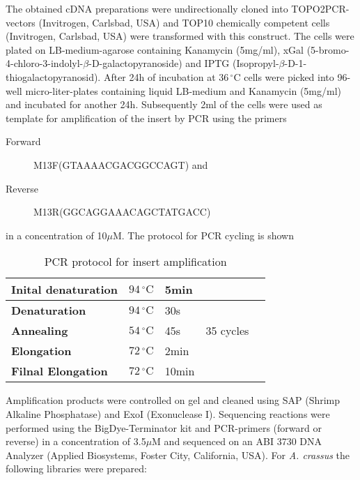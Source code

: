 The obtained cDNA preparations were undirectionally cloned into
TOPO2PCR-vectors (Invitrogen, Carlsbad, USA) and TOP10 chemically
competent cells (Invitrogen, Carlsbad, USA) were transformed with this
construct. The cells were plated on LB-medium-agarose containing
Kanamycin (5mg/ml), xGal
(5-bromo-4-chloro-3-indolyl-$\beta$-D-galactopyranoside) and IPTG
(Isopropyl-$\beta$-D-1-thiogalactopyranosid). After 24h of incubation
at $36\,^{\circ}\mathrm{C} $ cells were picked into 96-well
micro-liter-plates containing liquid LB-medium and Kanamycin (5mg/ml)
and incubated for another 24h. Subsequently 2ml of the cells were used
as template for amplification of the insert by PCR using the primers
\begin{description}
\item[Forward] M13F(GTAAAACGACGGCCAGT) and
\item[Reverse] M13R(GGCAGGAAACAGCTATGACC)
\end{description}
in a concentration of 10$\mu$M. The protocol for PCR cycling is shown

\begin{table}[h]
  \centering
  \begin{tabular}{lllll} 
    \textbf{Inital denaturation} &  $ 94\, ^{\circ}\mathrm{C} $ & 5min &  &\\ 
    \hline
    \textbf{Denaturation} &  $ 94\, ^{\circ}\mathrm{C} $ &30s& & \\ 
    \textbf{Annealing} &   $ 54\, ^{\circ}\mathrm{C} $ & 45s & 35 cycles &\\ 
    \textbf{Elongation} &   $ 72\, ^{\circ}\mathrm{C} $ & 2min &  &\\ 
    \hline
    \textbf{Filnal Elongation} &   $ 72\, ^{\circ}\mathrm{C} $ & 10min &\\ 
  \end{tabular}   
  \caption{PCR protocol for insert amplification}
  \label{tab:PCR}
\end{table}

Amplification products were controlled on gel and cleaned using SAP
(Shrimp Alkaline Phosphatase) and ExoI (Exonuclease I). Sequencing
reactions were performed using the BigDye-Terminator kit and
PCR-primers (forward or reverse) in a concentration of 3.5$\mu$M and
sequenced on an ABI 3730 DNA Analyzer (Applied Biosystems, Foster
City, California, USA).  For \textit{A. crassus} the following
libraries were prepared:
 


